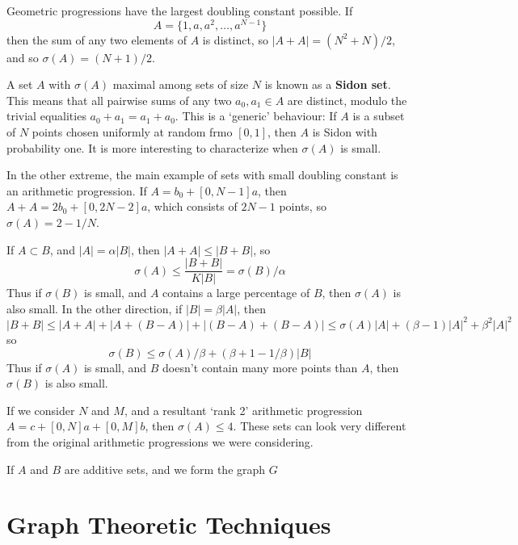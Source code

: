 \begin{example}
    Geometric progressions have the largest doubling constant possible. If
    \[ A = \{ 1, a, a^2, \dots, a^{N-1} \} \]
    then the sum of any two elements of $A$ is distinct, so $|A + A| = (N^2 + N)/2$, and so $\sigma(A) = (N+1)/2$.
\end{example}

A set $A$ with $\sigma(A)$ maximal among sets of size $N$ is known as a {\bf Sidon set}. This means that all pairwise sums of any two $a_0,a_1 \in A$ are distinct, modulo the trivial equalities $a_0 + a_1 = a_1 + a_0$. This is a `generic' behaviour: If $A$ is a subset of $N$ points chosen uniformly at random frmo $[0,1]$, then $A$ is Sidon with probability one. It is more interesting to characterize when $\sigma(A)$ is small.

\begin{example}
    In the other extreme, the main example of sets with small doubling constant is an arithmetic progression. If $A = b_0 + [0,N-1] a$, then $A + A = 2b_0 + [0,2N-2] a$, which consists of $2N-1$ points, so $\sigma(A) = 2 - 1/N$.
\end{example}

\begin{example}
    If $A \subset B$, and $|A| = \alpha |B|$, then $|A + A| \leq |B + B|$, so
    \[ \sigma(A) \leq \frac{|B+B|}{K|B|} = \sigma(B)/\alpha \]
    Thus if $\sigma(B)$ is small, and $A$ contains a large percentage of $B$, then $\sigma(A)$ is also small. In the other direction, if $|B| = \beta |A|$, then
    \[ |B+B| \leq |A + A| + |A + (B - A)| + |(B-A) + (B-A)| \leq \sigma(A)|A| + (\beta - 1)|A|^2 + \beta^2 |A|^2 \]
    so
    \[ \sigma(B) \leq \sigma(A)/\beta + (\beta + 1 - 1/\beta)|B| \]
    Thus if $\sigma(A)$ is small, and $B$ doesn't contain many more points than $A$, then $\sigma(B)$ is also small.
\end{example}

\begin{example}
    If we consider $N$ and $M$, and a resultant `rank 2' arithmetic progression $A = c + [0,N]a + [0,M]b$, then $\sigma(A) \leq 4$. These sets can look very different from the original arithmetic progressions we were considering.
\end{example}

If $A$ and $B$ are additive sets, and we form the graph $G$

\section{Graph Theoretic Techniques}

